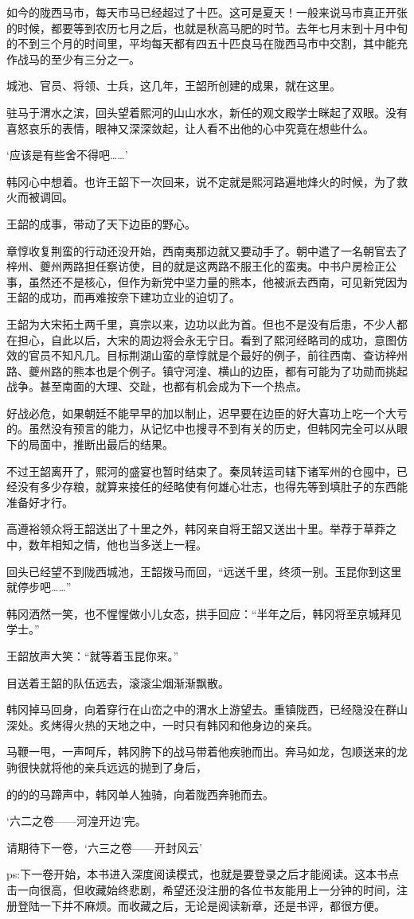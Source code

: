 如今的陇西马市，每天市马已经超过了十匹。这可是夏天！一般来说马市真正开张的时候，都要等到农历七月之后，也就是秋高马肥的时节。去年七月末到十月中旬的不到三个月的时间里，平均每天都有四五十匹良马在陇西马市中交割，其中能充作战马的至少有三分之一。

城池、官员、将领、士兵，这几年，王韶所创建的成果，就在这里。

驻马于渭水之滨，回头望着熙河的山山水水，新任的观文殿学士眯起了双眼。没有喜怒哀乐的表情，眼神又深深敛起，让人看不出他的心中究竟在想些什么。

‘应该是有些舍不得吧……’

韩冈心中想着。也许王韶下一次回来，说不定就是熙河路遍地烽火的时候，为了救火而被调回。

王韶的成事，带动了天下边臣的野心。

章惇收复荆蛮的行动还没开始，西南夷那边就又要动手了。朝中遣了一名朝官去了梓州、夔州两路担任察访使，目的就是这两路不服王化的蛮夷。中书户房检正公事，虽然还不是核心，但作为新党中坚力量的熊本，他被派去西南，可见新党因为王韶的成功，而再难按奈下建功立业的迫切了。

王韶为大宋拓土两千里，真宗以来，边功以此为首。但也不是没有后患，不少人都在担心，自此以后，大宋的周边将会永无宁日。看到了熙河经略司的成功，意图仿效的官员不知凡几。目标荆湖山蛮的章惇就是个最好的例子，前往西南、查访梓州路、夔州路的熊本也是个例子。镇守河湟、横山的边臣，都有可能为了功勋而挑起战争。甚至南面的大理、交趾，也都有机会成为下一个热点。

好战必危，如果朝廷不能早早的加以制止，迟早要在边臣的好大喜功上吃一个大亏的。虽然没有预言的能力，从记忆中也搜寻不到有关的历史，但韩冈完全可以从眼下的局面中，推断出最后的结果。

不过王韶离开了，熙河的盛宴也暂时结束了。秦凤转运司辖下诸军州的仓囤中，已经没有多少存粮，就算来接任的经略使有何雄心壮志，也得先等到填肚子的东西能准备好才行。

高遵裕领众将王韶送出了十里之外，韩冈亲自将王韶又送出十里。举荐于草莽之中，数年相知之情，他也当多送上一程。

回头已经望不到陇西城池，王韶拨马而回，“远送千里，终须一别。玉昆你到这里就停步吧……”

韩冈洒然一笑，也不惺惺做小儿女态，拱手回应：“半年之后，韩冈将至京城拜见学士。”

王韶放声大笑：“就等着玉昆你来。”

目送着王韶的队伍远去，滚滚尘烟渐渐飘散。

韩冈掉马回身，向着穿行在山峦之中的渭水上游望去。重镇陇西，已经隐没在群山深处。炙烤得火热的天地之中，一时只有韩冈和他身边的亲兵。

马鞭一甩，一声呵斥，韩冈胯下的战马带着他疾驰而出。奔马如龙，包顺送来的龙驹很快就将他的亲兵远远的抛到了身后，

的的的马蹄声中，韩冈单人独骑，向着陇西奔驰而去。

‘六二之卷——河湟开边’完。

请期待下一卷，‘六三之卷——开封风云’

ps:下一卷开始，本书进入深度阅读模式，也就是要登录之后才能阅读。这本书点击一向很高，但收藏始终悲剧，希望还没注册的各位书友能用上一分钟的时间，注册登陆一下并不麻烦。而收藏之后，无论是阅读新章，还是书评，都很方便。

